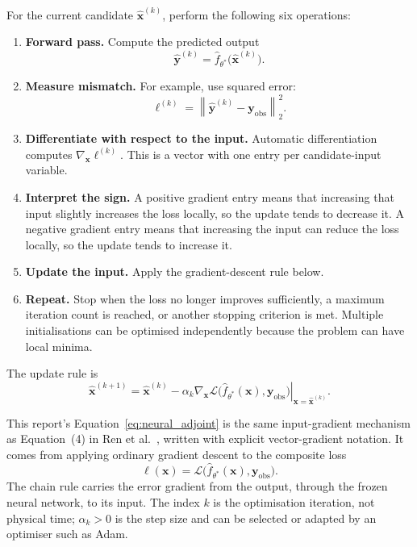 \documentclass[11pt]{article}
\newcommand{\vect}[1]{\mathbf{#1}}
\begin{document}
For the current candidate $\hat{\vect{x}}^{(k)}$, perform the following six operations:
\begin{enumerate}
    \item \textbf{Forward pass.} Compute the predicted output
    \begin{equation}
        \hat{\vect{y}}^{(k)}=
        \hat f_{\theta^\ast}\bigl(\hat{\vect{x}}^{(k)}\bigr).
        \label{eq:na_forward_pass}
    \end{equation}
    \item \textbf{Measure mismatch.} For example, use squared error:
    \begin{equation}
        \ell^{(k)}=
        \left\|
        \hat{\vect{y}}^{(k)}-\vect{y}_{\mathrm{obs}}
        \right\|_2^2.
        \label{eq:na_loss}
    \end{equation}
    \item \textbf{Differentiate with respect to the input.} Automatic differentiation computes $\nabla_{\vect{x}}\ell^{(k)}$. This is a vector with one entry per candidate-input variable.
    \item \textbf{Interpret the sign.} A positive gradient entry means that increasing that input slightly increases the loss locally, so the update tends to decrease it. A negative gradient entry means that increasing the input can reduce the loss locally, so the update tends to increase it.
    \item \textbf{Update the input.} Apply the gradient-descent rule below.
    \item \textbf{Repeat.} Stop when the loss no longer improves sufficiently, a maximum iteration count is reached, or another stopping criterion is met. Multiple initialisations can be optimised independently because the problem can have local minima.
\end{enumerate}

The update rule is
\begin{equation}
    \hat{\vect{x}}^{(k+1)}=
    \hat{\vect{x}}^{(k)}-
    \alpha_k\left.
    \nabla_{\vect{x}}
    \mathcal{L}\bigl(\hat f_{\theta^\ast}(\vect{x}),\vect{y}_{\mathrm{obs}}\bigr)
    \right|_{\vect{x}=\hat{\vect{x}}^{(k)}}.
    \label{eq:neural_adjoint}
\end{equation}

This report's Equation~\eqref{eq:neural_adjoint} is the same input-gradient mechanism as Equation~(4) in Ren et al.~\cite{ren2020}, written with explicit vector-gradient notation. It comes from applying ordinary gradient descent to the composite loss
\begin{equation}
    \ell(\vect{x})=
    \mathcal{L}\bigl(
    \hat f_{\theta^\ast}(\vect{x}),
    \vect{y}_{\mathrm{obs}}
    \bigr).
    \label{eq:na_composite_loss}
\end{equation}
The chain rule carries the error gradient from the output, through the frozen neural network, to its input. The index $k$ is the optimisation iteration, not physical time; $\alpha_k>0$ is the step size and can be selected or adapted by an optimiser such as Adam.
\end{document}
